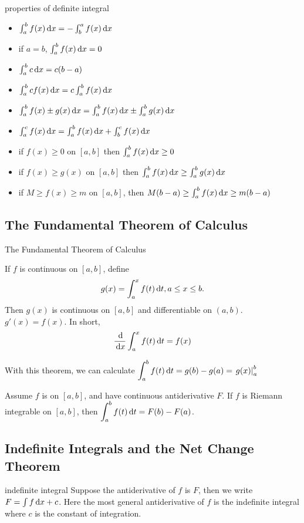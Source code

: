 \documentclass[Calculus 1 Recitation.tex]{subfiles}
\begin{document}
\begin{myleftlinebox}
	properties of definite integral
	\tcblower
	\begin{itemize}
		\item $\int_a^b f(x)\,\mathrm{d} x = -\int_b^a f(x) \,\mathrm{d} x$
		\item if $a=b$, $\int_a^b f(x)\,\mathrm{d} x =0$
		\item $\int_a^b c\,\mathrm{d} x =c(b-a)$
		\item $\int_a^b cf(x)\,\mathrm{d} x =c\int_a^b f(x)\,\mathrm{d} x $
		\item $\int_a^b f(x)\pm g(x)\,\mathrm{d} x = \int_a^b f(x)\,\mathrm{d} x \pm \int_a^b g(x)\,\mathrm{d} x$
		\item $\int_a^c f(x)\,\mathrm{d} x = \int_a^b f(x)\,\mathrm{d} x +\int_b^c f(x)\,\mathrm{d} x$
		\item if $f(x)\geq 0$ on $[a,b]$ then $\int_a^b f(x)\,\mathrm{d} x \geq 0$
		\item if $f(x)\geq g(x)$ on $[a,b]$ then $\int_a^b f(x)\,\mathrm{d} x \geq \int_a^b g(x)\,\mathrm{d} x$
		\item if $M\geq f(x)\geq m$ on $[a,b]$, then $M(b-a) \geq \int_a^b f(x)\,\mathrm{d} x \geq m(b-a)$
	\end{itemize}
\end{myleftlinebox}

\subsection{The Fundamental Theorem of Calculus}
\begin{myleftlinebox}
	The Fundamental Theorem of Calculus
	\tcblower
	\begin{theorem}
		If $f$ is continuous on $[a,b]$, define 
		\[g(x)=\int_{a}^x f(t)\,\mathrm{d} t, a\leq x\leq b.\]
		Then $g(x)$ is continuous on $[a,b]$ and differentiable on $(a,b)$. $g'(x)=f(x)$. In short,
		\[\frac{\,\mathrm{d}}{\,\mathrm{d} x}\int_a^x f(t)\,\mathrm{d} t=f(x)\]
	\end{theorem}
	With this theorem, we can calculate $\displaystyle\int_a^b f(t)\,\mathrm{d} t=g(b)-g(a)=\left.g(x)\right|_a^b$
	\begin{theorem}
		Assume $f$ is on $[a,b]$, and have continuous antiderivative $F$. If $f$ is Riemann integrable on $[a,b]$, then $\displaystyle\int_a^b f(t)\,\mathrm{d} t=F(b)-F(a)$.
	\end{theorem}
\end{myleftlinebox}

\subsection{Indefinite Integrals and the Net Change Theorem}
\begin{myleftlinebox}
	indefinite integral
	\tcblower
	Suppose the antiderivative of $f$ is $F$, then we write $F = \int f \,\mathrm{d} x +c$. Here the most general antiderivative of $f$ is the indefinite integral where $c$ is the constant of integration.
\end{myleftlinebox}
\end{document}
